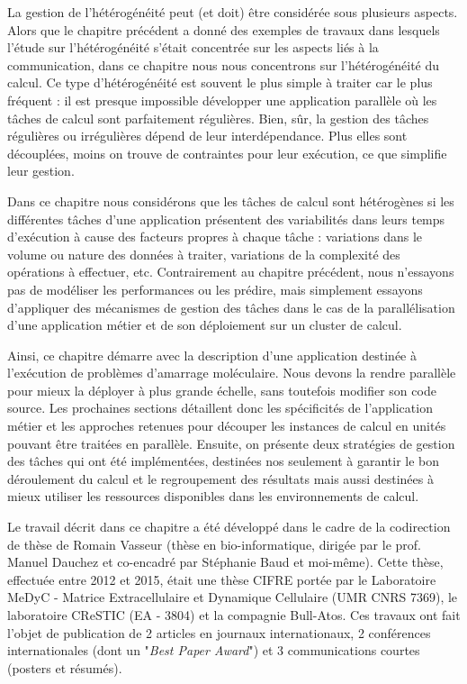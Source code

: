 \begin{resume}
La gestion de l'hétérogénéité peut (et doit) être considérée sous plusieurs aspects. Alors que le chapitre précédent a donné des exemples de travaux dans lesquels l'étude sur l'hétérogénéité s'était concentrée sur les aspects liés à la communication, dans ce chapitre nous nous concentrons sur l'hétérogénéité du calcul. Ce type d'hétérogénéité est souvent le plus simple à traiter car le plus fréquent : il est presque impossible développer une application parallèle où les tâches de calcul sont parfaitement régulières. Bien, sûr, la gestion des tâches régulières ou irrégulières dépend de leur interdépendance. Plus elles sont découplées, moins on trouve de contraintes pour leur exécution, ce que simplifie leur gestion.

Dans ce chapitre nous considérons que les tâches de calcul sont hétérogènes si les différentes tâches d'une application présentent des variabilités dans leurs temps d'exécution à cause des facteurs propres à chaque tâche : variations dans le volume ou nature des données à traiter, variations de la complexité des opérations à effectuer, etc. Contrairement au chapitre précédent, nous n'essayons pas de modéliser les performances ou les prédire, mais simplement essayons d'appliquer des mécanismes de gestion des tâches dans le cas de la parallélisation d'une application métier et de son déploiement sur un cluster de calcul.

Ainsi, ce chapitre démarre avec la description d'une application destinée à l'exécution de problèmes d'amarrage moléculaire. Nous devons la rendre parallèle pour mieux la déployer à plus grande échelle, sans toutefois modifier son code source. Les prochaines sections détaillent donc les spécificités de l'application métier et les approches retenues pour découper les instances de calcul en unités pouvant être traitées en parallèle. Ensuite, on présente deux stratégies de gestion des tâches qui ont été implémentées, destinées nos seulement à garantir le bon déroulement du calcul et le regroupement des résultats mais aussi destinées à mieux utiliser les ressources disponibles dans les environnements de calcul.

Le travail décrit dans ce chapitre a été développé dans le cadre de la codirection de thèse de Romain Vasseur (thèse en bio-informatique, dirigée par le prof. Manuel Dauchez et co-encadré par Stéphanie Baud et moi-même). Cette thèse, effectuée entre 2012 et 2015, était une thèse CIFRE portée par le Laboratoire MeDyC - Matrice Extracellulaire et Dynamique Cellulaire (UMR CNRS 7369), le laboratoire CReSTIC (EA - 3804) et la compagnie Bull-Atos. Ces travaux ont fait l'objet de publication de 2 articles en journaux internationaux, 2 conférences internationales (dont un "\textit{Best Paper Award}") et 3 communications courtes (posters et résumés).

\end{resume}

